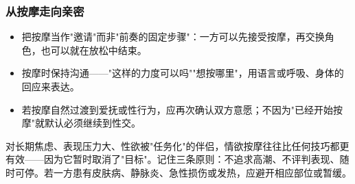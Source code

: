 \subsubsection{从按摩走向亲密}
\begin{itemize}
	\item 把按摩当作"邀请"而非"前奏的固定步骤"：一方可以先接受按摩，再交换角色，也可以就在放松中结束。
	\item 按摩时保持沟通——"这样的力度可以吗""想按哪里"，用语言或呼吸、身体的回应来表达。
	\item 若按摩自然过渡到爱抚或性行为，应再次确认双方意愿；不因为"已经开始按摩"就默认必须继续到性交。
\end{itemize}

\begin{tcolorbox}[colback=pink!5!white,colframe=red!50!black,title=贴心小叮咛]
对长期焦虑、表现压力大、性欲被"任务化"的伴侣，情欲按摩往往比任何技巧都更有效——因为它暂时取消了"目标"。记住三条原则：不追求高潮、不评判表现、随时可停。若一方患有皮肤病、静脉炎、急性损伤或发热，应避开相应部位或暂缓。
\end{tcolorbox}